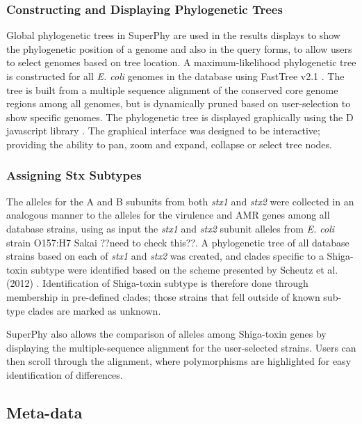 \documentclass[a4paper,twoside]{article}
\begin{document}
\subsubsection{Constructing and Displaying Phylogenetic Trees}

Global phylogenetic trees in SuperPhy are used in the results displays to show the phylogenetic position of a genome and also in the query forms, to allow users to select genomes based on tree location. A maximum-likelihood phylogenetic tree is constructed for all \textit{E. coli} genomes in the database using FastTree v2.1 \cite{price_fasttree_2010}. The tree is built from a multiple sequence alignment of the conserved core genome regions among all genomes, but is dynamically pruned based on user-selection to show specific genomes. The phylogenetic tree is displayed graphically using the D javascript library \cite{bostock2011d3}. The graphical interface was designed to be interactive; providing the ability to pan, zoom and expand, collapse or select tree nodes.

\subsubsection{Assigning Stx Subtypes}

The alleles for the A and B subunits from both \textit{stx1} and \textit{stx2} were collected in an analogous manner to the alleles for the virulence and AMR genes among all database strains, using as input the \textit{stx1} and \textit{stx2} subunit alleles from \textit{E. coli} strain O157:H7 Sakai ??need to check this??. A phylogenetic tree of all database strains based on each of \textit{stx1} and \textit{stx2} was created, and clades specific to a Shiga-toxin subtype were identified based on the scheme presented by Scheutz et al. (2012) \cite{scheutz_multicenter_2012}. Identification of Shiga-toxin subtype is therefore done through membership in pre-defined clades; those strains that fell outside of known sub-type clades are marked as unknown.

SuperPhy also allows the comparison of alleles among Shiga-toxin genes by displaying the multiple-sequence alignment for the user-selected strains. Users can then scroll through the alignment, where polymorphisms are highlighted for easy identification of differences.

\subsection{Meta-data}
\end{document}
